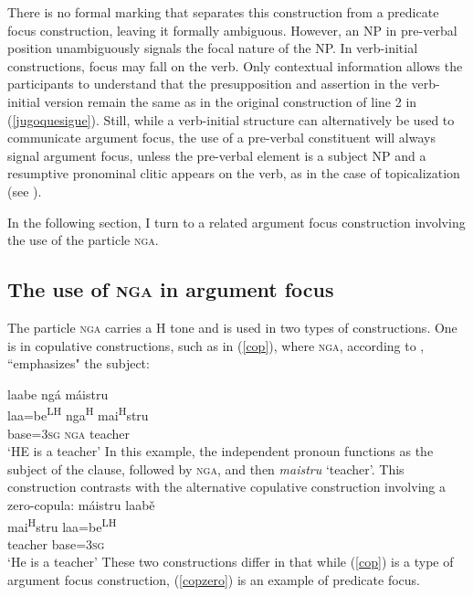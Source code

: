 \z
There is no formal marking that separates this construction from a predicate focus construction, leaving it formally ambiguous. However, an NP in pre-verbal position unambiguously signals the focal nature of the NP. In verb-initial constructions, focus may fall on the verb. Only contextual information allows the participants to understand that the presupposition and assertion in the verb-initial version remain the same as in the original construction of line 2 in (\ref{jugoquesigue}). Still, while a verb-initial structure can alternatively be used to communicate argument focus, the use of a pre-verbal constituent will always signal argument focus, unless the pre-verbal element is a subject NP and a resumptive pronominal clitic appears on the verb, as in the case of topicalization (see ). 

In the following section, I turn to a related argument focus construction involving the use of the particle \textsc{nga}.

\subsection{The use of \textsc{nga} in argument focus}\label{ngaargfoc}

The particle \textsc{nga} carries a H tone and is used in two types of constructions. One is in copulative constructions, such as in (\ref{cop}), where \textsc{nga}, according to \citet[94]{pickett1998}, ``emphasizes" the subject:

\ea\label{cop}
\glll laabe ng\'{a} m\'{a}istru \\
laa=be\textsuperscript{LH} nga\textsuperscript{H} mai\textsuperscript{H}stru \\
base=3\textsc{sg} \textsc{nga} teacher \\
\glt `HE is a teacher' \hfill \citep[94]{pickett1998}
\z
In this example, the independent pronoun functions as the subject of the clause, followed by \textsc{nga}, and then \textit{maistru} `teacher'. This construction contrasts with the alternative copulative construction involving a zero-copula:
\ea\label{copzero}
\glll m\'{a}istru laab\v{e} \\
mai\textsuperscript{H}stru laa=be\textsuperscript{LH} \\
teacher base=3\textsc{sg}  \\
\glt `He is a teacher' 
\z
These two constructions differ in that while (\ref{cop}) is a type of argument focus construction, (\ref{copzero}) is an example of predicate focus. 

